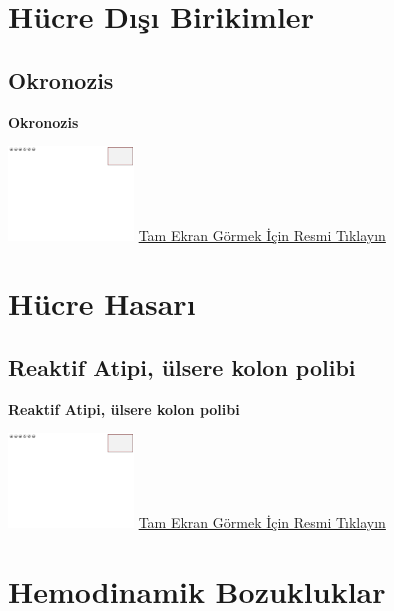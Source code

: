 \documentclass[
  letterpaper,
  DIV=11,
  numbers=noendperiod]{scrreprt}
\begin{document}
\hypertarget{sec-hucre-disi-birikimler}{%
\chapter{Hücre Dışı Birikimler}\label{sec-hucre-disi-birikimler}}

\hypertarget{sec-okronozis}{%
\section{Okronozis}\label{sec-okronozis}}

\textbf{Okronozis}

\href{https://images.patolojiatlasi.com/template/HE.html}{\includegraphics[width=0.25\textwidth,height=\textheight]{./screenshots/template_screenshot.png}}
\href{https://images.patolojiatlasi.com/ochronosis/HE.html}{Tam Ekran
Görmek İçin Resmi Tıklayın}

\hypertarget{sec-hucre-hasari}{%
\chapter{Hücre Hasarı}\label{sec-hucre-hasari}}

\hypertarget{sec-reaktif-atipi}{%
\section{Reaktif Atipi, ülsere kolon polibi}\label{sec-reaktif-atipi}}

\textbf{Reaktif Atipi, ülsere kolon polibi}

\href{https://images.patolojiatlasi.com/template/HE.html}{\includegraphics[width=0.25\textwidth,height=\textheight]{./screenshots/template_screenshot.png}}
\href{https://images.patolojiatlasi.com/reactive-atypia/HE.html}{Tam
Ekran Görmek İçin Resmi Tıklayın}

\hypertarget{sec-hemodinamik-bozukluklar}{%
\chapter{Hemodinamik Bozukluklar}\label{sec-hemodinamik-bozukluklar}}
\end{document}
